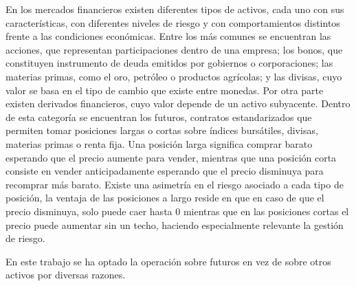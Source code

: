 En los mercados financieros existen diferentes tipos de activos, cada uno con sus características, con diferentes niveles de riesgo y con
comportamientos distintos frente a las condiciones económicas. Entre los más comunes se encuentran las acciones, que representan participaciones
dentro de una empresa; los bonos, que constituyen instrumento de deuda emitidos por gobiernos o corporaciones; las materias primas, como el oro,
petróleo o productos agrícolas; y las divisas, cuyo valor se basa en el tipo de cambio que existe entre monedas. Por otra parte existen derivados
financieros, cuyo valor depende de un activo subyacente. Dentro de esta categoría se encuentran los futuros, contratos estandarizados que permiten
tomar posiciones largas o cortas sobre índices bursátiles, divisas, materias primas o renta fija. Una posición larga significa comprar barato
esperando que el precio aumente para vender, mientras que una posición corta consiste en vender anticipadamente esperando que el precio disminuya para
recomprar más barato. Existe una asimetría en el riesgo asociado a cada tipo de posición, la ventaja de las posiciones a largo reside en que en caso
de que el precio disminuya, solo puede caer hasta 0 mientras que en las posiciones cortas el precio puede aumentar sin un techo, haciendo
especialmente relevante la gestión de riesgo.

En este trabajo se ha optado la operación sobre futuros en vez de sobre otros activos por diversas razones.


